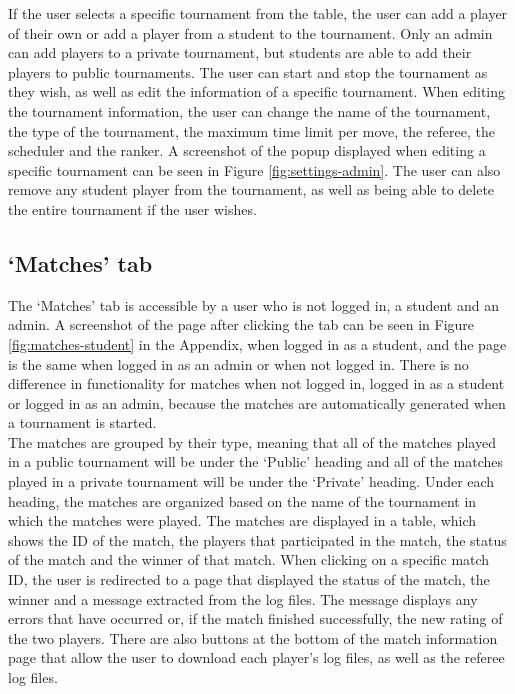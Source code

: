 \documentclass[a4paper, 11pt]{report}
\begin{document}
If the user selects a specific tournament from the table, the user can add a player
of their own or add a player from a student to the tournament. Only an admin can
add players to a private tournament, but students are able to add their players
to public tournaments. The user can start and stop the tournament as they wish,
as well as edit the information of a specific tournament. When editing the
tournament information, the user can change the name of the tournament, the type
of the tournament, the maximum time limit per move, the referee, the scheduler
and the ranker. A screenshot of the popup displayed when editing a specific
tournament can be seen in Figure \ref{fig:settings-admin}. The user can also
remove any student player from the tournament, as well as being able to delete
the entire tournament if the user wishes.

\subsection{`Matches' tab}
\label{sec:impl-tab-matches}

The `Matches' tab is accessible by a user who is not logged in, a student
and an admin. A screenshot of the page after clicking the tab can be seen in
Figure \ref{fig:matches-student} in the Appendix, when logged in as a student,
and the page is the same when logged in as an admin or when not logged in.
There is no difference in functionality for matches when not logged in,
logged in as a student or logged in as an admin, because the matches are
automatically generated when a tournament is started. \\

The matches are grouped by their type, meaning that all of the matches played in
a public tournament will be under the `Public' heading and all of the matches
played in a private tournament will be under the `Private' heading. Under each
heading, the matches are organized based on the name of the tournament in which
the matches were played. The matches are displayed in a table, which shows the
ID of the match, the players that participated in the match, the status of the
match and the winner of that match. When clicking on a specific match ID, the user
is redirected to a page that displayed the status of the match, the winner and a
message extracted from the log files. The message displays any errors that have
occurred or, if the match finished successfully, the new rating of the two
players. There are also buttons at the bottom of the match information page that
allow the user to download each player's log files, as well as the referee log
files.
\end{document}
